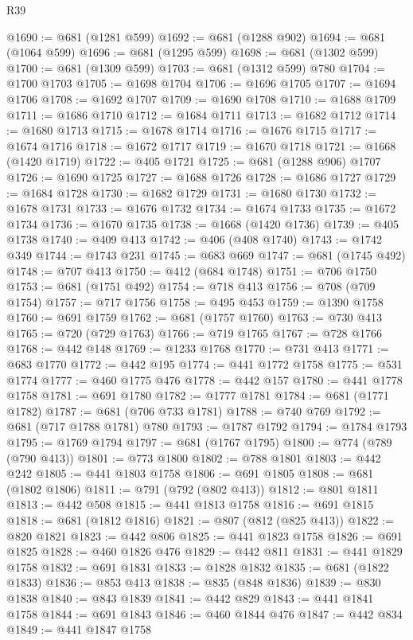 \begin{lexlean}{R39}
\begin{coremodule}
@1690 := @681 (@1281 @599)
@1692 := @681 (@1288 @902)
@1694 := @681 (@1064 @599)
@1696 := @681 (@1295 @599)
@1698 := @681 (@1302 @599)
@1700 := @681 (@1309 @599)
@1703 := @681 (@1312 @599) @780
@1704 := @1700 @1703
@1705 := @1698 @1704
@1706 := @1696 @1705
@1707 := @1694 @1706
@1708 := @1692 @1707
@1709 := @1690 @1708
@1710 := @1688 @1709
@1711 := @1686 @1710
@1712 := @1684 @1711
@1713 := @1682 @1712
@1714 := @1680 @1713
@1715 := @1678 @1714
@1716 := @1676 @1715
@1717 := @1674 @1716
@1718 := @1672 @1717
@1719 := @1670 @1718
@1721 := @1668 (@1420 @1719)
@1722 := @405 @1721
@1725 := @681 (@1288 @906) @1707
@1726 := @1690 @1725
@1727 := @1688 @1726
@1728 := @1686 @1727
@1729 := @1684 @1728
@1730 := @1682 @1729
@1731 := @1680 @1730
@1732 := @1678 @1731
@1733 := @1676 @1732
@1734 := @1674 @1733
@1735 := @1672 @1734
@1736 := @1670 @1735
@1738 := @1668 (@1420 @1736)
@1739 := @405 @1738
@1740 := @409 @413
@1742 := @406 (@408 @1740)
@1743 := @1742 @349
@1744 := @1743 @231
@1745 := @683 @669
@1747 := @681 (@1745 @492)
@1748 := @707 @413
@1750 := @412 (@684 @1748)
@1751 := @706 @1750
@1753 := @681 (@1751 @492)
@1754 := @718 @413
@1756 := @708 (@709 @1754)
@1757 := @717 @1756
@1758 := @495 @453
@1759 := @1390 @1758
@1760 := @691 @1759
@1762 := @681 (@1757 @1760)
@1763 := @730 @413
@1765 := @720 (@729 @1763)
@1766 := @719 @1765
@1767 := @728 @1766
@1768 := @442 @148
@1769 := @1233 @1768
@1770 := @731 @413
@1771 := @683 @1770
@1772 := @442 @195
@1774 := @441 @1772 @1758
@1775 := @531 @1774
@1777 := @460 @1775 @476
@1778 := @442 @157
@1780 := @441 @1778 @1758
@1781 := @691 @1780
@1782 := @1777 @1781
@1784 := @681 (@1771 @1782)
@1787 := @681 (@706 @733 @1781)
@1788 := @740 @769
@1792 := @681 (@717 @1788 @1781) @780
@1793 := @1787 @1792
@1794 := @1784 @1793
@1795 := @1769 @1794
@1797 := @681 (@1767 @1795)
@1800 := @774 (@789 (@790 @413))
@1801 := @773 @1800
@1802 := @788 @1801
@1803 := @442 @242
@1805 := @441 @1803 @1758
@1806 := @691 @1805
@1808 := @681 (@1802 @1806)
@1811 := @791 (@792 (@802 @413))
@1812 := @801 @1811
@1813 := @442 @508
@1815 := @441 @1813 @1758
@1816 := @691 @1815
@1818 := @681 (@1812 @1816)
@1821 := @807 (@812 (@825 @413))
@1822 := @820 @1821
@1823 := @442 @806
@1825 := @441 @1823 @1758
@1826 := @691 @1825
@1828 := @460 @1826 @476
@1829 := @442 @811
@1831 := @441 @1829 @1758
@1832 := @691 @1831
@1833 := @1828 @1832
@1835 := @681 (@1822 @1833)
@1836 := @853 @413
@1838 := @835 (@848 @1836)
@1839 := @830 @1838
@1840 := @843 @1839
@1841 := @442 @829
@1843 := @441 @1841 @1758
@1844 := @691 @1843
@1846 := @460 @1844 @476
@1847 := @442 @834
@1849 := @441 @1847 @1758

\end{coremodule}
\end{lexlean}
